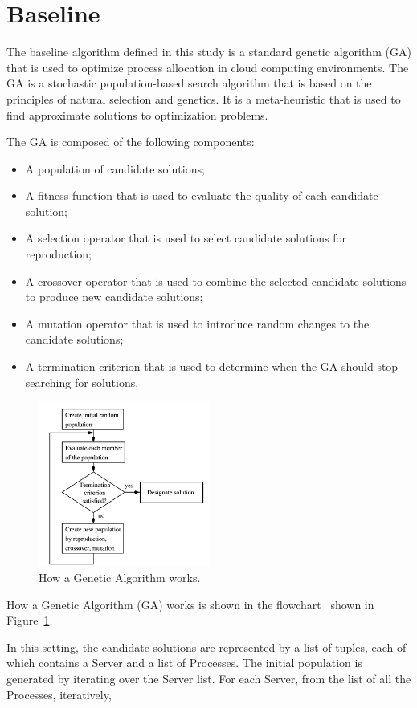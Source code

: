 \section{Baseline}\label{sect:baseline}

The baseline algorithm defined in this study is a standard genetic algorithm (GA) that is used to optimize 
process allocation in cloud computing environments.
The GA is a stochastic population-based search algorithm that is based on the principles of natural selection and genetics.
It is a meta-heuristic that is used to find approximate solutions to optimization problems.

The GA is composed of the following components:
\begin{itemize}
    \item A population of candidate solutions;
    \item A fitness function that is used to evaluate the quality of each candidate solution;
    \item A selection operator that is used to select candidate solutions for reproduction;
    \item A crossover operator that is used to combine the selected candidate solutions to produce new candidate solutions;
    \item A mutation operator that is used to introduce random changes to the candidate solutions;
    \item A termination criterion that is used to determine when the GA should stop searching for solutions.
\end{itemize}

\begin{figure}[h]
    \centering
    \includegraphics[width=0.5\textwidth]{./resources/examples/GAWorkflow.png}
    \caption{How a Genetic Algorithm works.}
    \label{fig:baseline}
\end{figure}
How a Genetic Algorithm (GA) works is shown in the flowchart~\cite{GAWorkflow} shown in Figure~\ref{fig:baseline}.

In this setting, the candidate solutions are represented by a list of tuples, each of which contains a Server and a list of Processes.
The initial population is generated by iterating over the Server list. For each Server, from the list of all the Processes, iteratively,
